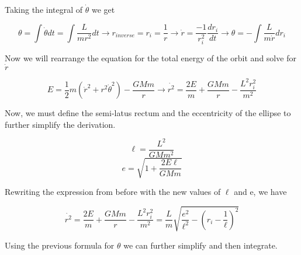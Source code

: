 \documentclass{article}
\begin{document}
Taking the integral of $\dot{\theta}$ we get 

$$\theta = \int \dot{\theta} dt = \int \frac{L}{mr^2} dt \rightarrow r_{inverse} = r_i = \frac{1}{r} \rightarrow \dot{r} = \frac{-1}{r_i^2} \frac{dr_i}{dt} \rightarrow \theta = -\int \frac{L}{m \dot{r}} dr_i$$

Now we will rearrange the equation for the total energy of the orbit and solve for $\dot{r}$

$$E = \frac{1}{2}m(\dot{r}^2 + r^2{\dot{\theta}}^2) - \frac{GMm}{r} 
 \rightarrow \dot{r^2} = \frac{2E}{m} + \frac{GMm}{r} - \frac{L^2r_i^2}{m^2}$$

Now, we must define the semi-latus rectum and the eccentricity of the ellipse to further simplify the derivation.

$$\ell = \frac{L^2}{GMm^2}$$ $$e = \sqrt{1 + \frac{2E\ell}{GMm}}$$

\begin{center}
\end{center}



Rewriting the expression from before with the new values of $\ell$ and e, we have

$$\dot{r^2} = \frac{2E}{m} + \frac{GMm}{r} - \frac{L^2r_i^2}{m^2} = \frac{L}{m}\sqrt{\frac{e^2}{\ell^2}-(r_i - \frac{1}{\ell})^2}$$

Using the previous formula for $\theta$ we can further simplify and then integrate.
\end{document}
